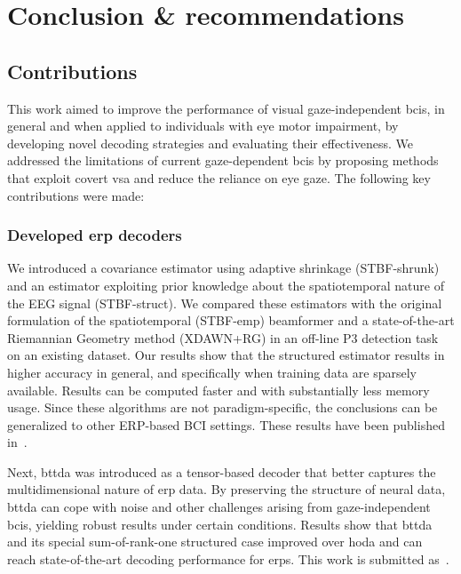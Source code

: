 \chapter{Conclusion \& recommendations}

\section{Contributions}

This work aimed to improve the performance of visual gaze-independent \acsp{bci}, in general
and when applied to individuals with eye motor impairment, by developing novel decoding
strategies and evaluating their effectiveness.
We addressed the limitations of current gaze-dependent \acp{bci} by proposing methods that
exploit covert \ac{vsa} and reduce the reliance on eye gaze.
The following key contributions were made:

\subsection{Developed \acs{erp} decoders}
We introduced a covariance estimator using adaptive shrinkage (STBF-shrunk) and an estimator
exploiting prior knowledge about the spatiotemporal nature of the EEG signal
(STBF-struct).
We compared these estimators with the original formulation of the
spatiotemporal (STBF-emp)
beamformer and a state-of-the-art Riemannian Geometry method (XDAWN+RG) in an off-line P3 detection task on
an existing dataset.
Our results show that the structured estimator results in higher accuracy in
general, and specifically when training data are sparsely available.
Results can be computed faster and with
substantially less memory usage.
Since these algorithms are not paradigm-specific, the conclusions can be
generalized to other ERP-based BCI settings.
These results have been published in~\textcite{VanDenKerchove2022}.

Next, \acf{bttda} was introduced as a tensor-based decoder that better captures the
multidimensional nature of \ac{erp} data.
By preserving the structure of neural data, \ac{bttda} can cope with noise and other challenges
arising from gaze-independent \acp{bci}, yielding robust results under certain conditions.
Results show that \ac{bttda} and its special sum-of-rank-one structured case
improved over \ac{hoda} and can reach state-of-the-art decoding performance for
\acp{erp}.
This work is submitted as~\textcite{VanDenKerchove2024}.

